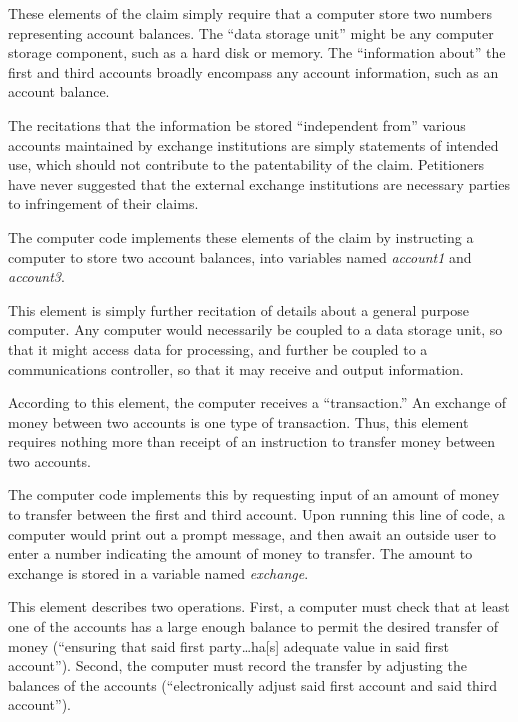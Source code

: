 \documentclass{scotus}
\begin{document}

These elements of the claim simply require that a computer store two numbers
representing account balances. The ``data storage unit'' might be any computer
storage component, such as a hard disk or memory. The ``information about'' the
first and third accounts broadly encompass any account information, such as an
account balance.

The recitations that the information be stored ``independent from'' various
accounts maintained by exchange institutions are simply statements of intended
use, which should not contribute to the patentability of the claim. Petitioners
have never suggested that the external exchange institutions are necessary
parties to infringement of their claims.

The computer code implements these elements of the claim by instructing a
computer to store two account balances, into variables named \emph{account1} and
\emph{account3}.


This element is simply further recitation of details about a general purpose
computer. Any computer would necessarily be coupled to a data storage unit, so
that it might access data for processing, and further be coupled to a
communications controller, so that it may receive and output information.


According to this element, the computer receives a ``transaction.'' An exchange
of money between two accounts is one type of transaction. Thus, this element
requires nothing more than receipt of an instruction to transfer money between
two accounts.

The computer code implements this by requesting input of an amount of money to
transfer between the first and third account. Upon running this line of code,
a computer would print out a prompt message, and then await an outside user to
enter a number indicating the amount of money to transfer. The amount to
exchange is stored in a variable named \emph{exchange}.


This element describes two operations. First, a computer must check that at
least one of the accounts has a large enough balance to permit the desired
transfer of money (``ensuring that said first party\ldots ha[s] adequate value
in
said first account''). Second, the computer must record the transfer by
adjusting the balances of the accounts (``electronically adjust said first
account and said third account'').
\end{document}
